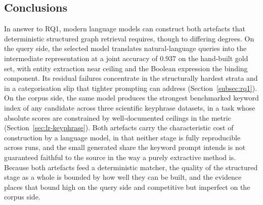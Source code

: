\subsection{Conclusions}
\label{sec:conclusion-conclusions}

In answer to RQ1, modern language models can construct both artefacts that deterministic structured graph retrieval requires, though to differing degrees. On the query side, the selected model translates natural-language queries into the intermediate representation at a joint accuracy of 0.937 on the hand-built gold set, with entity extraction near ceiling and the Boolean expression the binding component. Its residual failures concentrate in the structurally hardest strata and in a categorisation slip that tighter prompting can address (Section~\ref{subsec:rq1}). On the corpus side, the same model produces the strongest benchmarked keyword index of any candidate across three scientific keyphrase datasets, in a task whose absolute scores are constrained by well-documented ceilings in the metric (Section~\ref{sec:lr-keyphrase}). Both artefacts carry the characteristic cost of construction by a language model, in that neither stage is fully reproducible across runs, and the small generated share the keyword prompt intends is not guaranteed faithful to the source in the way a purely extractive method is. Because both artefacts feed a deterministic matcher, the quality of the structured stage as a whole is bounded by how well they can be built, and the evidence places that bound high on the query side and competitive but imperfect on the corpus side.

